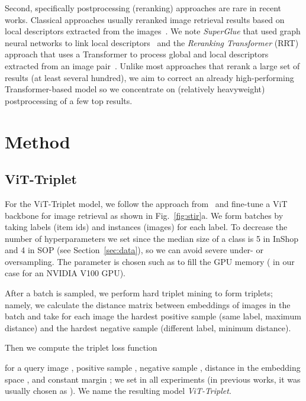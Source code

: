 \documentclass{article}
\begin{document}
Second, specifically postprocessing (reranking) approaches are rare in recent works. Classical approaches usually reranked image retrieval results based on local descriptors extracted from the images~\cite{DBLP:journals/corr/NohASH16,8954470,10.1007/978-3-030-58565-5_43}. We note \emph{SuperGlue} that used graph neural networks to link local descriptors~\cite{sarlin20superglue} and the \emph{Reranking Transformer} (RRT) approach that uses a Transformer to process global and local descriptors extracted from an image pair~\cite{DBLP:conf/iccv/TanYO21}. Unlike most approaches that rerank a large set of results (at least several hundred), we aim to correct an already high-performing Transformer-based model so we concentrate on (relatively heavyweight) postprocessing of a few top results.

\section{Method}\label{sec:method}

\subsection{ViT-Triplet}

For the ViT-Triplet model, we follow the approach from~\cite{DBLP:journals/corr/HermansBL17,DBLP:journals/corr/abs-1912-07863} and fine-tune a ViT backbone for image retrieval as shown in Fig.~\ref{fig:stir}a. We form batches by taking  labels (item ids) and  instances (images) for each label. 
To decrease the number of hyperparameters we set  since the median size of a class is 5 in InShop and 4 in SOP (see Section~\ref{sec:data}), so we can avoid severe under- or oversampling. The parameter  is chosen such as to fill the GPU memory ( in our case for an NVIDIA V100 GPU). 




After a batch is sampled, we perform hard triplet mining to form  triplets; namely, we calculate the distance matrix between embeddings of images in the batch and take for each image the hardest positive sample (same label, maximum distance) and the hardest negative sample (different label, minimum distance). 

Then we compute the triplet loss function 

for a query image , positive sample , negative sample , distance in the embedding space , and constant margin ; we set  in all experiments (in previous works, it was usually chosen as ). We name the resulting model \emph{ViT-Triplet}.
\end{document}

